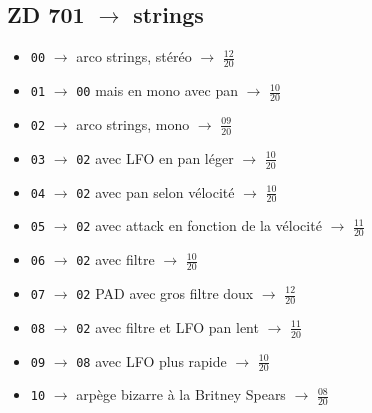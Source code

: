 \documentclass[a4paper, 13pt]{article}
\begin{document}
\vspace{1cm}
\subsection*{ZD 701 $\rightarrow$ strings}
\begin{itemize}
    \item \texttt{00} $\rightarrow$ \textsf{arco strings}, stéréo $\rightarrow$ \Large{$\frac{12}{20}$} \normalsize \vspace{0.2cm}
    \item \texttt{01} $\rightarrow$ \texttt{00} mais en mono avec pan $\rightarrow$ \Large{$\frac{10}{20}$} \normalsize \vspace{0.2cm}
    \item \texttt{02} $\rightarrow$ \textsf{arco strings}, mono $\rightarrow$ \Large{$\frac{09}{20}$} \normalsize \vspace{0.2cm}
    \item \texttt{03} $\rightarrow$ \texttt{02} avec LFO en pan léger $\rightarrow$ \Large{$\frac{10}{20}$} \normalsize \vspace{0.2cm}
    \item \texttt{04} $\rightarrow$ \texttt{02} avec pan selon vélocité $\rightarrow$ \Large{$\frac{10}{20}$} \normalsize \vspace{0.2cm}
    \item \texttt{05} $\rightarrow$ \texttt{02} avec attack en fonction de la vélocité $\rightarrow$ \Large{$\frac{11}{20}$} \normalsize \vspace{0.2cm}
    \item \texttt{06} $\rightarrow$ \texttt{02} avec filtre $\rightarrow$ \Large{$\frac{10}{20}$} \normalsize \vspace{0.2cm}
    \item \texttt{07} $\rightarrow$ \texttt{02} PAD avec gros filtre doux $\rightarrow$ \Large{$\frac{12}{20}$} \normalsize \vspace{0.2cm}
    \item \texttt{08} $\rightarrow$ \texttt{02} avec filtre et LFO pan lent $\rightarrow$ \Large{$\frac{11}{20}$} \normalsize \vspace{0.2cm}
    \item \texttt{09} $\rightarrow$ \texttt{08} avec LFO plus rapide $\rightarrow$ \Large{$\frac{10}{20}$} \normalsize \vspace{0.2cm}
    \item \texttt{10} $\rightarrow$ arpège bizarre à la Britney Spears $\rightarrow$ \Large{$\frac{08}{20}$} \normalsize \vspace{0.2cm}

\end{itemize}
\end{document}
